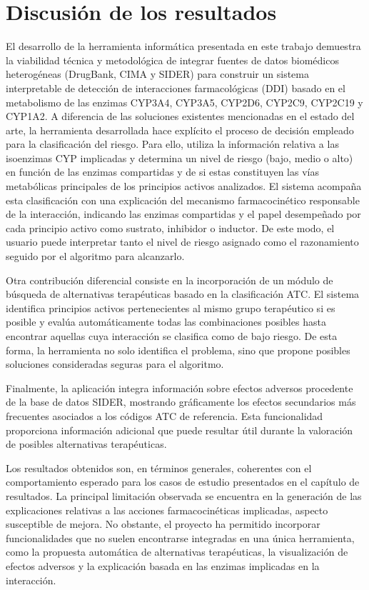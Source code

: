 
\section{Discusión de los resultados}
El desarrollo de la herramienta informática presentada en este trabajo demuestra la viabilidad técnica y metodológica de integrar fuentes de datos biomédicos heterogéneas (DrugBank, CIMA y SIDER) para construir un sistema interpretable de detección de interacciones farmacológicas (DDI) basado en el metabolismo de las enzimas CYP3A4, CYP3A5, CYP2D6, CYP2C9, CYP2C19 y CYP1A2. A diferencia de las soluciones existentes mencionadas en el estado del arte, la herramienta desarrollada hace explícito el proceso de decisión empleado para la clasificación del riesgo. Para ello, utiliza la información relativa a las isoenzimas CYP implicadas y determina un nivel de riesgo (bajo, medio o alto) en función de las enzimas compartidas y de si estas constituyen las vías metabólicas principales de los principios activos analizados. El sistema acompaña esta clasificación con una explicación del mecanismo farmacocinético responsable de la interacción, indicando las enzimas compartidas y el papel desempeñado por cada principio activo como sustrato, inhibidor o inductor. De este modo, el usuario puede interpretar tanto el nivel de riesgo asignado como el razonamiento seguido por el algoritmo para alcanzarlo.

Otra contribución diferencial consiste en la incorporación de un módulo de búsqueda de alternativas terapéuticas basado en la clasificación ATC. El sistema identifica principios activos pertenecientes al mismo grupo terapéutico si es posible y evalúa automáticamente todas las combinaciones posibles hasta encontrar aquellas cuya interacción se clasifica como de bajo riesgo. De esta forma, la herramienta no solo identifica el problema, sino que propone posibles soluciones consideradas seguras para el algoritmo.

Finalmente, la aplicación integra información sobre efectos adversos procedente de la base de datos SIDER, mostrando gráficamente los efectos secundarios más frecuentes asociados a los códigos ATC de referencia. Esta funcionalidad proporciona información adicional que puede resultar útil durante la valoración de posibles alternativas terapéuticas.

Los resultados obtenidos son, en términos generales, coherentes con el comportamiento esperado para los casos de estudio presentados en el capítulo de resultados. La principal limitación observada se encuentra en la generación de las explicaciones relativas a las acciones farmacocinéticas implicadas, aspecto susceptible de mejora. No obstante, el proyecto ha permitido incorporar funcionalidades que no suelen encontrarse integradas en una única herramienta, como la propuesta automática de alternativas terapéuticas, la visualización de efectos adversos y la explicación basada en las enzimas implicadas en la interacción.

